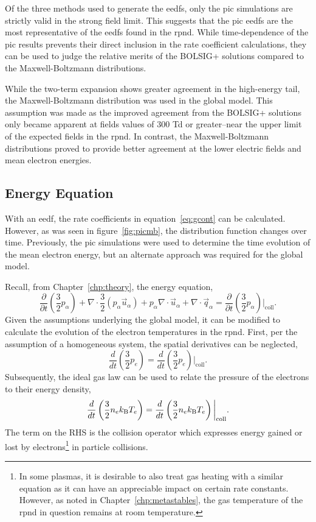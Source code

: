 Of the three methods used to generate the \acs{eedf}s, only the \acs{pic}
simulations are strictly valid in the strong field limit. This suggests that the
\acs{pic} \acs{eedf}s are the most representative of the \acs{eedf}s found in
the \acs{rpnd}. While time-dependence of the \acs{pic} results prevents their
direct inclusion in the rate coefficient calculations, they can be used to judge
the relative merits of the BOLSIG+ solutions compared to the Maxwell-Boltzmann
distributions.

While the two-term expansion shows greater agreement in the high-energy tail,
the Maxwell-Boltzmann distribution was used in the global model. This assumption
was made as the improved agreement from the BOLSIG+ solutions only became
apparent at fields values of 300 Td or greater--near the upper limit of the
expected fields in the \acs{rpnd}. In contrast, the Maxwell-Boltzmann
distributions proved to provide better agreement at the lower electric fields
and mean electron energies.

\subsection{Energy Equation}

With an \acs{eedf}, the rate coefficients in equation~\ref{eq:gcont} can be
calculated. However, as was seen in figure~\ref{fig:picmb}, the distribution
function changes over time. Previously, the \acs{pic} simulations were used to
determine the time evolution of the mean electron energy, but an alternate
approach was required for the global model.

Recall, from Chapter~\ref{chp:theory}, the energy equation,
\begin{equation}
  \frac{\partial}{\partial t}\left(\frac{3}{2}p_\alpha\right) 
  + \nabla\cdot\frac{3}{2} (p_\alpha\vec{u}_\alpha)
  + p_\alpha\nabla\cdot\vec{u}_\alpha
  + \nabla\cdot\vec{q}_\alpha
  = \frac{\partial}{\partial
  t}\left(\frac{3}{2}p_\alpha\right)\bigg|_\mathrm{coll}.
\end{equation}
Given the assumptions underlying the global model, it can be modified to
calculate the evolution of the electron temperatures in the \acs{rpnd}. First,
per the assumption of a homogeneous system, the spatial derivatives can be
neglected,
\begin{equation}
  \frac{d}{dt}\left(\frac{3}{2}p_e\right) =
  \frac{d}{dt}\left(\frac{3}{2}p_e\right)\bigg|_\mathrm{coll}.
\end{equation}
Subsequently, the ideal gas law can be used to relate the pressure of the
electrons to their energy density,
\begin{equation}
  \frac{d}{dt}\left(\frac{3}{2}n_ek_\mathrm{B} T_e \right) =
  \frac{d}{dt}\left(\frac{3}{2}n_ek_\mathrm{B} T_e \right)\bigg|_\mathrm{coll}.
  \label{eq:energy2}
\end{equation}
The term on the RHS is the collision operator which expresses energy gained or
lost by electrons\footnote{In some plasmas, it is desirable to also treat gas
heating with a similar equation as it can have an appreciable impact on certain
rate constants. However, as noted in Chapter~\ref{chp:metastables}, the gas
temperature of the \acs{rpnd} in question remains at room temperature.} in
particle collisions.

